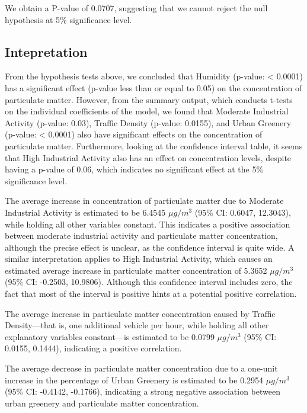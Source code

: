 \documentclass[
]{article}
\begin{document}
We obtain a P-value of 0.0707, suggesting that we cannot reject the null
hypothesis at 5\% significance level.

\hypertarget{intepretation}{%
\subsection{Intepretation}\label{intepretation}}

From the hypothesis tests above, we concluded that Humidity (p-value:
\textless{} 0.0001) has a significant effect (p-value less than or equal
to 0.05) on the concentration of particulate matter. However, from the
summary output, which conducts t-tests on the individual coefficients of
the model, we found that Moderate Industrial Activity (p-value: 0.03),
Traffic Density (p-value: 0.0155), and Urban Greenery (p-value:
\textless{} 0.0001) also have significant effects on the concentration
of particulate matter. Furthermore, looking at the confidence interval
table, it seems that High Industrial Activity also has an effect on
concentration levels, despite having a p-value of 0.06, which indicates
no significant effect at the 5\% significance level.

The average increase in concentration of particulate matter due to
Moderate Industrial Activity is estimated to be 6.4545 \(μg/m^3\) (95\%
CI: 0.6047, 12.3043), while holding all other variables constant. This
indicates a positive association between moderate industrial activity
and particulate matter concentration, although the precise effect is
unclear, as the confidence interval is quite wide. A similar
interpretation applies to High Industrial Activity, which causes an
estimated average increase in particulate matter concentration of 5.3652
\(μg/m^3\) (95\% CI: -0.2503, 10.9806). Although this confidence
interval includes zero, the fact that most of the interval is positive
hints at a potential positive correlation.

The average increase in particulate matter concentration caused by
Traffic Density---that is, one additional vehicle per hour, while
holding all other explanatory variables constant---is estimated to be
0.0799 \(μg/m^3\) (95\% CI: 0.0155, 0.1444), indicating a positive
correlation.

The average decrease in particulate matter concentration due to a
one-unit increase in the percentage of Urban Greenery is estimated to be
0.2954 \(μg/m^3\) (95\% CI: -0.4142, -0.1766), indicating a strong
negative association between urban greenery and particulate matter
concentration.
\end{document}
